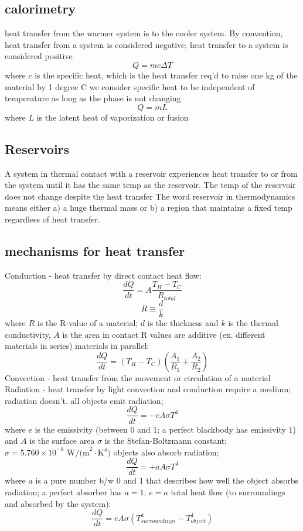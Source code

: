 \documentclass{article}
\begin{document}
\subsection{calorimetry}
\begin{outline}
\1 heat transfer from the warmer system is to the cooler system. By convention, heat transfer from a system is considered negative; heat transfer to a system is considered positive
\0 \[Q=mc\Delta T\]
\1 where $c$ is the specific heat, which is the heat transfer req'd to raise one kg of the material by 1 degree C
\1 we consider specific heat to be independent of temperature as long as the phase is not changing
\0 \[Q=mL\]
\1 where $L$ is the latent heat of vaporization or fusion
\end{outline}
\subsection{Reservoirs}
\begin{outline}
\1 A system in thermal contact with a reservoir experiences heat transfer to or from the system until it has the same temp as the reservoir. The temp of the reservoir does not change despite the heat transfer
\1 The word reservoir in thermodynamics means either a) a huge thermal mass or b) a region that maintains a fixed temp regardless of heat transfer. 
\end{outline}
\subsection{mechanisms for heat transfer}
\begin{outline}
\1 Conduction - heat transfer by direct contact
\1 heat flow: \[\dfrac{dQ}{dt}=A\dfrac{T_H-T_C}{R_{total}}\] \[R\equiv \dfrac{d}{k}\]
\1 where $R$ is the R-value of a material; $d$ is the thickness and $k$ is the thermal conductivity, $A$ is the area in contact
\1 R values are additive (ex. different materials in series)
\1 materials in parallel: \[\dfrac{dQ}{dt}=(T_H-T_C)\left(\dfrac{A_1}{R_1}+\dfrac{A_2}{R_2}\right)\]
\1 Convection - heat transfer from the movement or circulation of a material
\1 Radiation - heat transfer by light
\1 convection and conduction require a medium; radiation doesn't. 
\1 all objects emit radiation; \[\dfrac{dQ}{dt}=-eA\sigma T^4\] where $e$ is the emissivity (between 0 and 1; a perfect blackbody has emissivity 1) and $A$ is the surface area
\1 $\sigma$ is the Stefan-Boltzmann constant; \(\sigma=5.760\times10^{-8}\text{ W/(m}^2\cdot\text{K}^4\text{)}\)
\1 objects also absorb radiation; \[\dfrac{dQ}{dt}=+aA\sigma T^4\] where $a$ is a pure number b/w 0 and 1 that describes how well the object absorbs radiation; a perfect absorber has $a=1$; $e=a$
\1 total heat flow (to surroundings and absorbed by the system): \[\dfrac{dQ}{dt}=eA\sigma\left(T^4_{surroundings}-T^4_{object}\right)\]
\end{outline}
\end{document}

